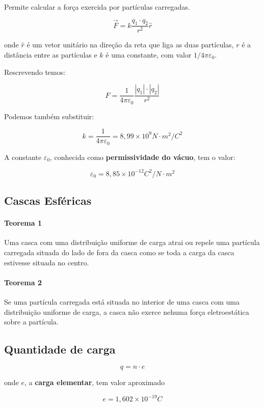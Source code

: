 Permite calcular a força exercida por partículas carregadas.

\[
\vec{F} = k \frac{q_1 \cdot q_2}{r^2} \hat{r}
\]

onde $\hat{r}$ é um vetor unitário na direção da reta que liga as duas
partículas, $r$ é a distância entre as partículas e $k$ é uma constante,
com valor $1/4 \pi \varepsilon_0$.

Rescrevendo temos:

\[
F = \frac{1}{4 \pi \varepsilon_0} \frac{|q_1| \cdot |q_2|}{r^2}
\]

Podemos também substituir:

\[
k = \frac{1}{4 \pi \varepsilon_0} = 8,99 \times 10^9 N \cdot m^2/C^2
\]

A constante $\varepsilon_0$, conhecida como \textbf{permissividade do
vácuo}, tem o valor:

\[
\varepsilon_0 = 8,85 \times 10^{-12} C^2/N \cdot m^2
\]

\subsection{Cascas Esféricas}\label{cascas-esfuxe9ricas}

\paragraph{Teorema 1}\label{teorema-1-1}

Uma casca com uma distribuição uniforme de carga atrai ou repele uma
partícula carregada situada do lado de fora da casca como se toda a
carga da casca estivesse situada no centro.

\paragraph{Teorema 2}\label{teorema-2}

Se uma partícula carregada está situada no interior de uma casca com uma
distribuição uniforme de carga, a casca não exerce nehuma força
eletroestática sobre a partícula.

\subsection{Quantidade de carga}\label{quantidade-de-carga}

\[
q = n \cdot e
\]

onde $e$, a \textbf{carga elementar}, tem valor aproximado

\[
e = 1,602 \times 10^{-19} C
\]

